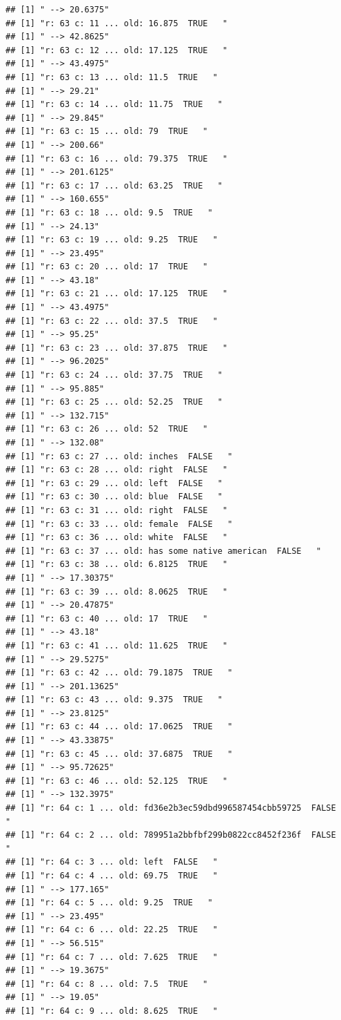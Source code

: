 \documentclass[]{article}
\begin{document}
\begin{verbatim}
## [1] " --> 20.6375"
## [1] "r: 63 c: 11 ... old: 16.875  TRUE   "
## [1] " --> 42.8625"
## [1] "r: 63 c: 12 ... old: 17.125  TRUE   "
## [1] " --> 43.4975"
## [1] "r: 63 c: 13 ... old: 11.5  TRUE   "
## [1] " --> 29.21"
## [1] "r: 63 c: 14 ... old: 11.75  TRUE   "
## [1] " --> 29.845"
## [1] "r: 63 c: 15 ... old: 79  TRUE   "
## [1] " --> 200.66"
## [1] "r: 63 c: 16 ... old: 79.375  TRUE   "
## [1] " --> 201.6125"
## [1] "r: 63 c: 17 ... old: 63.25  TRUE   "
## [1] " --> 160.655"
## [1] "r: 63 c: 18 ... old: 9.5  TRUE   "
## [1] " --> 24.13"
## [1] "r: 63 c: 19 ... old: 9.25  TRUE   "
## [1] " --> 23.495"
## [1] "r: 63 c: 20 ... old: 17  TRUE   "
## [1] " --> 43.18"
## [1] "r: 63 c: 21 ... old: 17.125  TRUE   "
## [1] " --> 43.4975"
## [1] "r: 63 c: 22 ... old: 37.5  TRUE   "
## [1] " --> 95.25"
## [1] "r: 63 c: 23 ... old: 37.875  TRUE   "
## [1] " --> 96.2025"
## [1] "r: 63 c: 24 ... old: 37.75  TRUE   "
## [1] " --> 95.885"
## [1] "r: 63 c: 25 ... old: 52.25  TRUE   "
## [1] " --> 132.715"
## [1] "r: 63 c: 26 ... old: 52  TRUE   "
## [1] " --> 132.08"
## [1] "r: 63 c: 27 ... old: inches  FALSE   "
## [1] "r: 63 c: 28 ... old: right  FALSE   "
## [1] "r: 63 c: 29 ... old: left  FALSE   "
## [1] "r: 63 c: 30 ... old: blue  FALSE   "
## [1] "r: 63 c: 31 ... old: right  FALSE   "
## [1] "r: 63 c: 33 ... old: female  FALSE   "
## [1] "r: 63 c: 36 ... old: white  FALSE   "
## [1] "r: 63 c: 37 ... old: has some native american  FALSE   "
## [1] "r: 63 c: 38 ... old: 6.8125  TRUE   "
## [1] " --> 17.30375"
## [1] "r: 63 c: 39 ... old: 8.0625  TRUE   "
## [1] " --> 20.47875"
## [1] "r: 63 c: 40 ... old: 17  TRUE   "
## [1] " --> 43.18"
## [1] "r: 63 c: 41 ... old: 11.625  TRUE   "
## [1] " --> 29.5275"
## [1] "r: 63 c: 42 ... old: 79.1875  TRUE   "
## [1] " --> 201.13625"
## [1] "r: 63 c: 43 ... old: 9.375  TRUE   "
## [1] " --> 23.8125"
## [1] "r: 63 c: 44 ... old: 17.0625  TRUE   "
## [1] " --> 43.33875"
## [1] "r: 63 c: 45 ... old: 37.6875  TRUE   "
## [1] " --> 95.72625"
## [1] "r: 63 c: 46 ... old: 52.125  TRUE   "
## [1] " --> 132.3975"
## [1] "r: 64 c: 1 ... old: fd36e2b3ec59dbd996587454cbb59725  FALSE   "
## [1] "r: 64 c: 2 ... old: 789951a2bbfbf299b0822cc8452f236f  FALSE   "
## [1] "r: 64 c: 3 ... old: left  FALSE   "
## [1] "r: 64 c: 4 ... old: 69.75  TRUE   "
## [1] " --> 177.165"
## [1] "r: 64 c: 5 ... old: 9.25  TRUE   "
## [1] " --> 23.495"
## [1] "r: 64 c: 6 ... old: 22.25  TRUE   "
## [1] " --> 56.515"
## [1] "r: 64 c: 7 ... old: 7.625  TRUE   "
## [1] " --> 19.3675"
## [1] "r: 64 c: 8 ... old: 7.5  TRUE   "
## [1] " --> 19.05"
## [1] "r: 64 c: 9 ... old: 8.625  TRUE   "

\end{verbatim}
\end{document}

